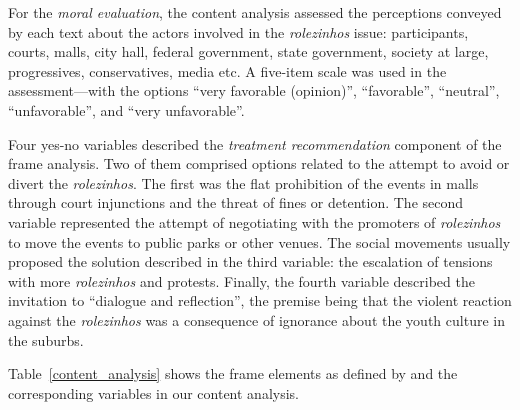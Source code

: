 For the \emph{moral evaluation}, the content analysis assessed the perceptions conveyed by each text about the actors involved in the \emph{rolezinhos} issue: participants, courts, malls, city hall, federal government, state government, society at large, progressives, conservatives, media etc. A five-item scale was used in the assessment---with the options \enquote{very favorable (opinion)}, \enquote{favorable}, \enquote{neutral}, \enquote{unfavorable}, and \enquote{very unfavorable}.

Four yes-no variables described the \emph{treatment recommendation} component of the frame analysis. Two of them comprised options related to the attempt to avoid or divert the \emph{rolezinhos}. The first was the flat prohibition of the events in malls through court injunctions and the threat of fines or detention. The second variable represented the attempt of negotiating with the promoters of \emph{rolezinhos} to move the events to public parks or other venues. The social movements usually proposed the solution described in the third variable: the escalation of tensions with more \emph{rolezinhos} and protests. Finally, the fourth variable described the invitation to \enquote{dialogue and reflection}, the premise being that the violent reaction against the \emph{rolezinhos} was a consequence of ignorance about the youth culture in the suburbs.

Table~\ref{content_analysis} shows the frame elements as defined by \citeauthor{entman1993framing} and the corresponding variables in our content analysis.


